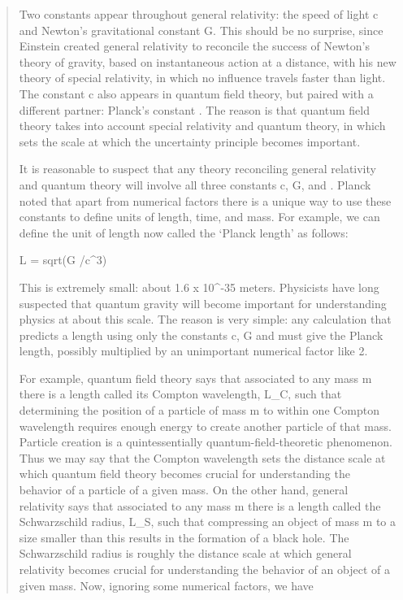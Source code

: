 \begin{quote}
Two constants appear throughout general relativity: the speed of light
c and Newton's gravitational constant G.   This should be no
surprise, since Einstein created general relativity to reconcile the
success of Newton's theory of gravity, based on instantaneous action at
a distance, with his new theory of special relativity, in which no
influence travels faster than light.  The constant c also appears in
quantum field theory, but paired with a different partner: Planck's
constant \hbar .   The reason is that quantum field theory takes
into account special relativity and quantum theory, in which \hbar 
sets the scale at which the uncertainty principle becomes important.  

It is reasonable to suspect that any theory reconciling general
relativity and quantum theory will involve all three constants c, G,
and \hbar .  Planck noted that apart from numerical factors there
is a unique way to use these constants to define units of length, time, 
and mass.  For example, we can define the unit of length now
called the `Planck length' as follows:

                       L = sqrt(\hbar  G /c^3)

This is extremely small: about 1.6 x 10^{-35} meters.   Physicists have
long suspected that quantum gravity will become important for
understanding physics at about this scale.   The reason is very simple:
any calculation that predicts a length using only the constants c, G and
\hbar  must give the Planck length, possibly multiplied by an unimportant
numerical factor like 2\pi .  

For example, quantum field theory says that associated to any mass m
there is a length called its Compton wavelength, L_C, such that
determining the position of a particle of mass m to within one Compton
wavelength requires enough energy to create another particle of that
mass.  Particle creation is a quintessentially quantum-field-theoretic
phenomenon.  Thus we may say that the Compton wavelength sets the
distance scale at which quantum field theory becomes crucial for
understanding the behavior of a particle of a given mass.  On the other
hand, general relativity says that associated to any mass m there is a
length called the Schwarzschild radius, L_S, such that compressing
an object of mass m to a size smaller than this results in the
formation of a black hole.  The Schwarzschild radius is roughly the
distance scale at which general relativity becomes crucial for
understanding the behavior of an object of a given mass.  Now, ignoring
some numerical factors, we have  


\end{quote}
